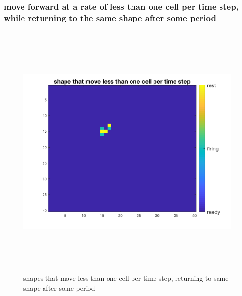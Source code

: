 \documentclass[12pt]{article}
\begin{document}
\subsubsection{move forward at a rate of less than one cell per time step, while returning to the same shape after some period}
\begin{figure}[H] %
\centering
\includegraphics[width = 16 cm, height = 13cm]{task2_3.png}
\caption{shapes that move less than one cell per time step, returning to same shape after some period}
\label{fig:task2_3}
\end{figure}
\end{document}
